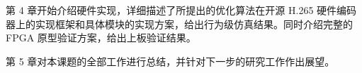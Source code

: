 第 4 章开始介绍硬件实现，详细描述了所提出的优化算法在开源 H.265 硬件编码器上的实现框架和具体模块的实现方案，给出行为级仿真结果。同时介绍完整的 FPGA 原型验证方案，给出上板验证结果。

第 5 章对本课题的全部工作进行总结，并针对下一步的研究工作作出展望。



